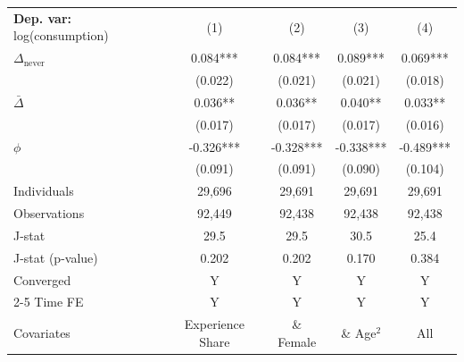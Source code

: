 \begin{tabular}{l cccc} \toprule  \textbf{Dep. var:}  log(consumption) 
                    &\multicolumn{1}{c}{(1)}   &\multicolumn{1}{c}{(2)}   &\multicolumn{1}{c}{(3)}   &\multicolumn{1}{c}{(4)}   \\

\addlinespace
$\Delta_{\text{never}}$&       0.084***&       0.084***&       0.089***&       0.069***\\
                    &     (0.022)   &     (0.021)   &     (0.021)   &     (0.018)   \\

\addlinespace
$\bar{\Delta}$      &       0.036** &       0.036** &       0.040** &       0.033** \\
                    &     (0.017)   &     (0.017)   &     (0.017)   &     (0.016)   \\

\addlinespace
$\phi$              &      -0.326***&      -0.328***&      -0.338***&      -0.489***\\
                    &     (0.091)   &     (0.091)   &     (0.090)   &     (0.104)   \\
\addlinespace
Individuals         &      29,696   &      29,691   &      29,691   &      29,691   \\
Observations        &      92,449   &      92,438   &      92,438   &      92,438   \\
J-stat              &        29.5   &        29.5   &        30.5   &        25.4   \\
J-stat (p-value)    &       0.202   &       0.202   &       0.170   &       0.384   \\
Converged           &           Y   &           Y   &           Y   &           Y   \\
\cmidrule{2-5} Time FE & Y & Y & Y & Y \\ Covariates & Experience Share & \& Female & \& Age$^2$ & All \\ \bottomrule \end{tabular}
